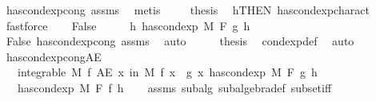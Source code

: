\begin{isabellebody}
\ has{\isacharunderscore}{\kern0pt}cond{\isacharunderscore}{\kern0pt}exp{\isacharunderscore}{\kern0pt}cong\ assms\ \isamarkupfalse%
\ metis\ \isanewline
\ \ \isamarkupfalse%
\ {\isacharquery}{\kern0pt}thesis\ \isamarkupfalse%
\ h{\isacharbrackleft}{\kern0pt}THEN\ has{\isacharunderscore}{\kern0pt}cond{\isacharunderscore}{\kern0pt}exp{\isacharunderscore}{\kern0pt}charact{\isacharparenleft}{\kern0pt}{}{\isacharparenright}{\kern0pt}{\isacharbrackright}{\kern0pt}\ \isamarkupfalse%
\ fastforce\isanewline
{}\isamarkupfalse%
\isanewline
\ \ \isamarkupfalse%
\ False\isanewline
\ \ \isamarkupfalse%
\ \isamarkupfalse%
\ {\isachardoublequoteopen}{\isasymnexists}h{\isachardot}{\kern0pt}\ has{\isacharunderscore}{\kern0pt}cond{\isacharunderscore}{\kern0pt}exp\ M\ F\ g\ h{\isachardoublequoteclose}\ \isamarkupfalse%
\ False\ has{\isacharunderscore}{\kern0pt}cond{\isacharunderscore}{\kern0pt}exp{\isacharunderscore}{\kern0pt}cong\ assms\ \isamarkupfalse%
\ auto\isanewline
\ \ \isamarkupfalse%
\ \isamarkupfalse%
\ {\isacharquery}{\kern0pt}thesis\ \isamarkupfalse%
\ cond{\isacharunderscore}{\kern0pt}exp{\isacharunderscore}{\kern0pt}def\ \isamarkupfalse%
\ auto\isanewline
{}\isamarkupfalse%
%
\endisatagproof
{\isafoldproof}%
%
\isadelimproof
\isanewline
%
\endisadelimproof
\isanewline
{}\isamarkupfalse%
\ has{\isacharunderscore}{\kern0pt}cond{\isacharunderscore}{\kern0pt}exp{\isacharunderscore}{\kern0pt}cong{\isacharunderscore}{\kern0pt}AE{\isacharcolon}{\kern0pt}\isanewline
\ \ \ {\isachardoublequoteopen}integrable\ M\ f{\isachardoublequoteclose}\ {\isachardoublequoteopen}AE\ x\ in\ M{\isachardot}{\kern0pt}\ f\ x\ {\isacharequal}{\kern0pt}\ g\ x{\isachardoublequoteclose}\ {\isachardoublequoteopen}has{\isacharunderscore}{\kern0pt}cond{\isacharunderscore}{\kern0pt}exp\ M\ F\ g\ h{\isachardoublequoteclose}\isanewline
\ \ \ {\isachardoublequoteopen}has{\isacharunderscore}{\kern0pt}cond{\isacharunderscore}{\kern0pt}exp\ M\ F\ f\ h{\isachardoublequoteclose}\isanewline
%
\isadelimproof
\ \ %
\endisadelimproof
%
\isatagproof
{}\isamarkupfalse%
\ assms{\isacharparenleft}{\kern0pt}{}{\isacharcomma}{\kern0pt}{}{\isacharparenright}{\kern0pt}\ subalg\ subalgebra{\isacharunderscore}{\kern0pt}def\ subset{\isacharunderscore}{\kern0pt}iff\ \isanewline

\end{isabellebody}
